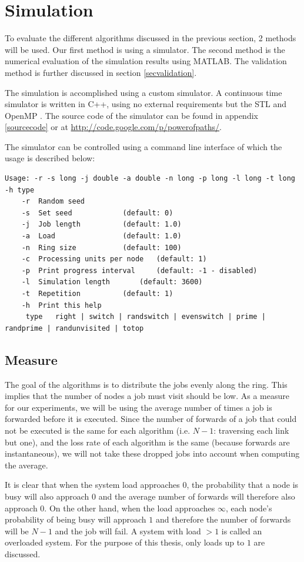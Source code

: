 \documentclass[10pt,a4paper]{article}
\begin{document}
\section{Simulation}
\label{secsimulation}
To evaluate the different algorithms discussed in the previous section, 2 methods will be used. Our first method is using a simulator. The second method is the numerical evaluation of the simulation results using MATLAB. The validation method is further discussed in section \ref{secvalidation}.

The simulation is accomplished using a custom simulator. A continuous time simulator is written in C++, using no external requirements but the STL and OpenMP \cite{OPENMP}. The source code of the simulator can be found in appendix \ref{sourcecode} or at \url{http://code.google.com/p/powerofpaths/}.

The simulator can be controlled using a command line interface of which the usage is described below:
\begin{lstlisting}
Usage: -r -s long -j double -a double -n long -p long -l long -t long -h type
	-r	Random seed
	-s	Set seed			(default: 0)
	-j	Job length			(default: 1.0)
	-a	Load				(default: 1.0)
	-n	Ring size			(default: 100)
	-c	Processing units per node	(default: 1)
	-p	Print progress interval		(default: -1 - disabled)
	-l	Simulation length		(default: 3600)
	-t	Repetition			(default: 1)
	-h	Print this help
	 type	right | switch | randswitch | evenswitch | prime | randprime | randunvisited | totop
\end{lstlisting}

\subsection{Measure}
The goal of the algorithms is to distribute the jobs evenly along the ring. This implies that the number of nodes a job must visit should be low. As a measure for our experiments, we will be using the average number of times a job is forwarded before it is executed. Since the number of forwards of a job that could not be executed is the same for each algorithm (i.e. $N-1$: traversing each link but one), and the loss rate of each algorithm is the same (because forwards are instantaneous), we will not take these dropped jobs into account when computing the average.

It is clear that when the system load approaches $0$, the probability that a node is busy will also approach $0$ and the average number of forwards will therefore also approach $0$. On the other hand, when the load approaches $\infty$, each node's probability of being busy will approach $1$ and therefore the number of forwards will be $N-1$ and the job will fail. A system with load $> 1$ is called an overloaded system. For the purpose of this thesis, only loads up to $1$ are discussed.
\end{document}
